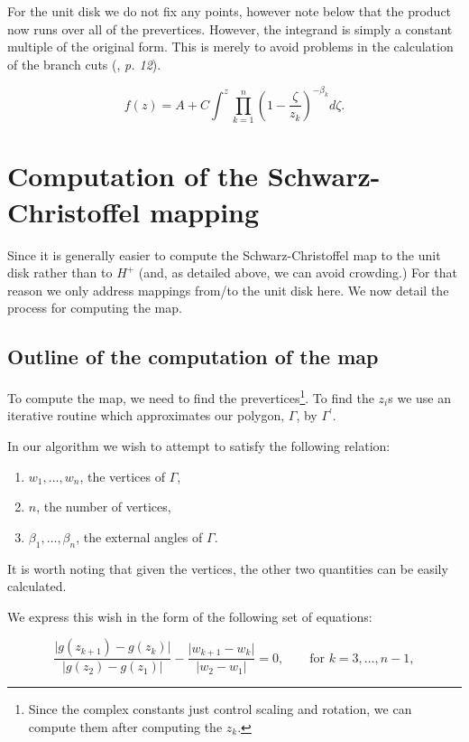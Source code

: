 \documentclass[a4paper,10pt]{amsart}
\newcommand{\sch}{Schwarz-Christoffel }
\begin{document}
For the unit disk we do not fix any points, however note below that the product now runs over all of the prevertices. However, the integrand is simply a constant multiple of the original form. This is merely to avoid problems in the calculation of the branch cuts (\cite{driscoll}, \emph{p. 12}).

\begin{equation}
\label{unitscmap}
f(z) = A + C \int^z \prod_{k=1}^{n} (1 - \frac{\zeta}{z_k})^{-\beta_k} d\zeta.
\end{equation}


\section{Computation of the \sch mapping}

Since it is generally easier to compute the \sch map to the unit disk rather than to $H^+$ (and, as detailed above, we can avoid crowding.) For that reason we only address mappings from/to the unit disk here. We now detail the process for computing the map.


\subsection{Outline of the computation of the map}
To compute the map, we need to find the prevertices\footnote{Since the complex constants just control scaling and rotation, we can compute them after computing the $z_k$.}. To find the $z_i$s we use an iterative routine which approximates our polygon, $\Gamma$, by $\Gamma^\prime$. 

In our algorithm we wish to attempt to satisfy the following relation: 

\begin{enumerate}
\item $w_1, \dots, w_n$, the vertices of $\Gamma$,
\item $n$, the number of vertices,
\item $\beta_1, \dots, \beta_n$, the external angles of $\Gamma$.
\end{enumerate}

It is worth noting that given the vertices, the other two quantities can be easily calculated.

We express this wish in the form of the following set of equations:

\begin{equation}
\label{optimizeme}
\frac{\vert g(z_{k+1}) -  g(z_k) \vert}{\vert g(z_2)-g(z_1)\vert} - \frac{\vert w_{k+1} - w_k\vert}{\vert w_2 - w_1\vert} = 0, \qquad \text{for } k=3,\dots,n-1,
\end{equation}
\end{document}
